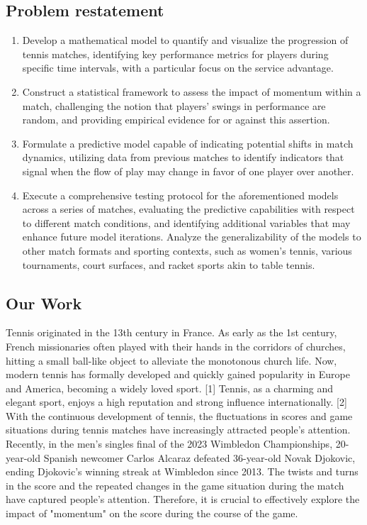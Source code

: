 \documentclass{article}
\begin{document}
\subsection{Problem restatement}
\begin{enumerate}
\item  Develop a mathematical model to quantify and visualize the progression of tennis matches, identifying key performance metrics for players during specific time intervals, with a particular focus on the service advantage.
\item Construct a statistical framework to assess the impact of momentum within a match, challenging the notion that players' swings in performance are random, and providing empirical evidence for or against this assertion.
\item Formulate a predictive model capable of indicating potential shifts in match dynamics, utilizing data from previous matches to identify indicators that signal when the flow of play may change in favor of one player over another.
\item Execute a comprehensive testing protocol for the aforementioned models across a series of matches, evaluating the predictive capabilities with respect to different match conditions, and identifying additional variables that may enhance future model iterations. Analyze the generalizability of the models to other match formats and sporting contexts, such as women's tennis, various tournaments, court surfaces, and racket sports akin to table tennis.
\end{enumerate}
\subsection{Our Work}
Tennis originated in the 13th century in France. As early as the 1st century, French missionaries often played with their hands in the corridors of churches, hitting a small ball-like
object to alleviate the monotonous church life. Now, modern tennis has formally developed and quickly gained popularity in Europe and America, becoming a widely loved sport. [1] Tennis, as a charming and elegant sport,
enjoys a high reputation and strong influence internationally. [2] With the continuous development of tennis, the fluctuations in scores and game situations during tennis matches have increasingly attracted people's attention.
Recently, in the men's singles final of the 2023 Wimbledon Championships, 20-year-old Spanish newcomer Carlos Alcaraz defeated 36-year-old Novak Djokovic, ending Djokovic's winning streak at Wimbledon since 2013. The twists and turns in the score
and the repeated changes in the game situation during the match have captured people's attention. Therefore, it is crucial to effectively explore the impact of "momentum" on the score during the course of the game.
\end{document}
